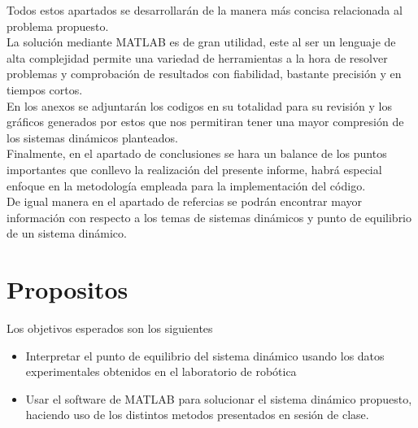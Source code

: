 \documentclass[12pt]{article}
\begin{document}
Todos estos apartados se desarrollarán de la manera más concisa relacionada al problema propuesto.\vspace{4mm} 
\\
La solución mediante MATLAB es de gran utilidad, este al ser un lenguaje de alta complejidad permite una variedad de herramientas a la hora de resolver problemas y comprobación de resultados con fiabilidad, bastante
precisión y en tiempos cortos. \vspace{4mm} 
\\
En los anexos se adjuntarán los codigos en su totalidad para su revisión y los gráficos generados por estos que nos permitiran tener una mayor compresión de los sistemas dinámicos planteados.\vspace{4mm}
\\
Finalmente, en el apartado de conclusiones se hara un balance de los puntos importantes que conllevo la realización del presente informe, habrá especial enfoque en la metodología empleada para la implementación del código.\vspace{4mm}
\\ 
De igual manera en el apartado de refercias se podrán encontrar mayor información con respecto a los temas de sistemas dinámicos y punto de equilibrio de un sistema dinámico.

\section{Propositos}
Los objetivos esperados son los siguientes
\begin{itemize}
    \item Interpretar  el punto de equilibrio del sistema dinámico usando los datos experimentales obtenidos en el laboratorio de robótica
    \item Usar el software de MATLAB para solucionar el sistema dinámico propuesto, haciendo uso de los distintos metodos presentados en sesión de clase.
\end{itemize}
\end{document}
